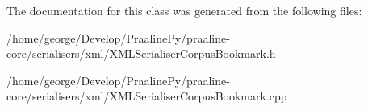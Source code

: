 The documentation for this class was generated from the following files\+:\begin{DoxyCompactItemize}
\item 
/home/george/\+Develop/\+Praaline\+Py/praaline-\/core/serialisers/xml/X\+M\+L\+Serialiser\+Corpus\+Bookmark.\+h\item 
/home/george/\+Develop/\+Praaline\+Py/praaline-\/core/serialisers/xml/X\+M\+L\+Serialiser\+Corpus\+Bookmark.\+cpp\end{DoxyCompactItemize}
